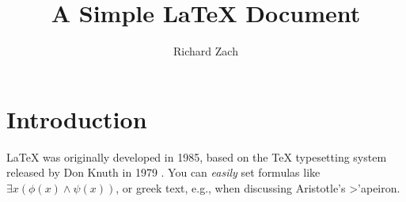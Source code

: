 \documentclass[11pt]{article}
\title{A Simple \LaTeX{} Document}
\author{Richard Zach}
\begin{document}
\maketitle

\section{Introduction}

\LaTeX{} was originally developed in 1985, based on the \TeX{}
typesetting system released by Don Knuth in 1979
\parencite{Lamport1986,Knuth1986}.  You can \emph{easily} set 
formulas like $\exists x(\phi(x) \land \psi(x))$, or greek text, e.g.,
when discussing Aristotle's \textgreek{>'apeiron}.

\printbibliography
\end{document}
